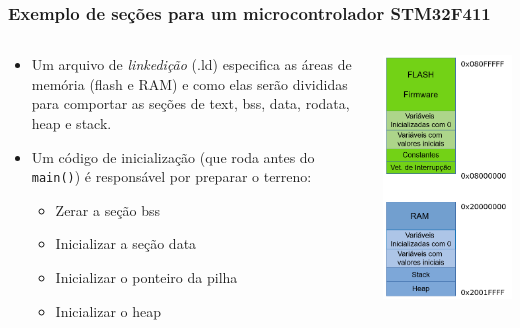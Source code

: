 \documentclass{beamer}
\begin{document}
\begin{frame}
	\frametitle{Exemplo de seções para um microcontrolador STM32F411}
	\begin{columns}[T] %
	\begin{column}{.60\textwidth}
	\begin{itemize}
		\item Um arquivo de \textit{linkedição} (.ld) especifica as áreas de memória (flash e RAM) e como elas serão divididas para comportar as seções de text, bss, data, rodata, heap e stack.
        \item Um código de inicialização (que roda antes do \texttt{main()}) é responsável por preparar o terreno:
        	\begin{itemize}
        		\item Zerar a seção bss
                \item Inicializar a seção data
                \item Inicializar o ponteiro da pilha
                \item Inicializar o heap
        	\end{itemize}
	\end{itemize}
	\end{column}%
	\hfill%
	\begin{column}{.40\textwidth}
        \includegraphics[scale=0.35]{imgs/sections.png}
	\end{column}%
\end{columns}
\end{frame}
\end{document}
